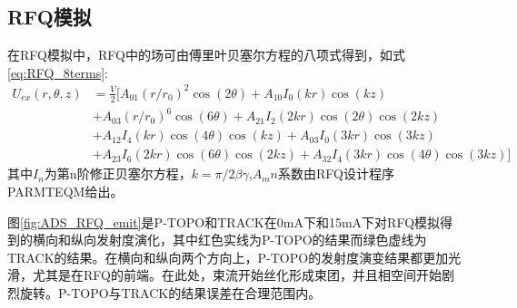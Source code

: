 \subsection{RFQ模拟}
在RFQ模拟中，RFQ中的场可由傅里叶贝塞尔方程的八项式得到，如式\ref{eq:RFQ_8terms}:
\begin{equation}
    \begin{aligned}
       {{U}_{ex}}(r,\theta ,z) & =\frac{V}{2}[{{A}_{01}}{{(r/{{r}_{0}})}^{2}}\cos (2\theta )+{{A}_{10}}{{I}_{0}}(kr)\cos (kz) \\
     & +{{A}_{03}}{{(r/{{r}_{0}})}^{6}}\cos (6\theta )+{{A}_{21}}{{I}_{2}}(2kr)\cos (2\theta )\cos (2kz) \\
     & +{{A}_{12}}{{I}_{4}}(kr)\cos (4\theta )\cos (kz)+{{A}_{03}}{{I}_{0}}(3kr)\cos (3kz) \\
     & +{{A}_{23}}{{I}_{6}}(2kr)\cos (6\theta )\cos (2kz)+{{A}_{32}}{{I}_{4}}(3kr)\cos (4\theta )\cos (3kz)]
    \end{aligned}
    \label{eq:RFQ_8terms}
\end{equation}
其中$I_n$为第n阶修正贝塞尔方程，$k=\pi /2\beta \gamma$,$A_mn$系数由RFQ设计程序PARMTEQM给出。

图\ref{fig:ADS_RFQ_emit}是P-TOPO和TRACK在0mA下和15mA下对RFQ模拟得到的横向和纵向发射度演化，其中红色实线为P-TOPO的结果而绿色虚线为TRACK的结果。在横向和纵向两个方向上，P-TOPO的发射度演变结果都更加光滑，尤其是在RFQ的前端。在此处，束流开始丝化形成束团，并且相空间开始剧烈旋转。P-TOPO与TRACK的结果误差在合理范围内。

